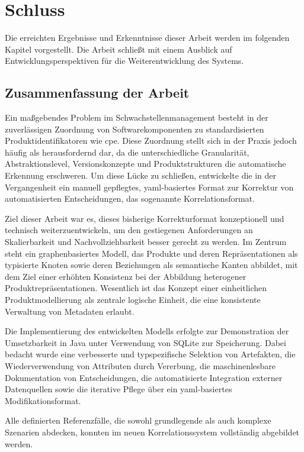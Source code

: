 \chapter{Schluss}\label{ch:abschluss}

Die erreichten Ergebnisse und Erkenntnisse dieser Arbeit werden im folgenden Kapitel vorgestellt.
Die Arbeit schließt mit einem Ausblick auf Entwicklungsperspektiven für die Weiterentwicklung des Systems.


\section{Zusammenfassung der Arbeit}\label{sec:schluss-zusammenfassung}

Ein maßgebendes Problem im Schwachstellenmanagement besteht in der zuverlässigen Zuordnung von Softwarekomponenten zu standardisierten Produktidentifikatoren wie \acrshort{cpe}.
Diese Zuordnung stellt sich in der Praxis jedoch häufig als herausfordernd dar, da die unterschiedliche Granularität, Abstraktionslevel, Versionskonzepte und Produktstrukturen die automatische Erkennung erschweren.
Um diese Lücke zu schließen, entwickelte die \metaeffektsp in der Vergangenheit ein manuell gepflegtes, \acrshort{yaml}-basiertes Format zur Korrektur von automatisierten Entscheidungen, das sogenannte Korrelationsformat.

Ziel dieser Arbeit war es, dieses bisherige Korrekturformat konzeptionell und technisch weiterzuentwickeln, um den gestiegenen Anforderungen an Skalierbarkeit und Nachvollziehbarkeit besser gerecht zu werden.
Im Zentrum steht ein graphenbasiertes Modell, das Produkte und deren Repräsentationen als typisierte Knoten sowie deren Beziehungen als semantische Kanten abbildet, mit dem Ziel einer erhöhten Konsistenz bei der Abbildung heterogener Produktrepräsentationen.
Wesentlich ist das Konzept einer einheitlichen Produktmodellierung als zentrale logische Einheit, die eine konsistente Verwaltung von Metadaten erlaubt.

Die Implementierung des entwickelten Modells erfolgte zur Demonstration der Umsetzbarkeit in Java unter Verwendung von SQLite zur Speicherung.
Dabei bedacht wurde eine verbesserte und typspezifische Selektion von Artefakten, die Wiederverwendung von Attributen durch Vererbung, die maschinenlesbare Dokumentation von Entscheidungen, die automatisierte Integration externer Datenquellen sowie die iterative Pflege über ein \acrshort{yaml}-basiertes Modifikationsformat.

Alle definierten Referenzfälle, die sowohl grundlegende als auch komplexe Szenarien abdecken, konnten im neuen Korrelationssystem vollständig abgebildet werden.


